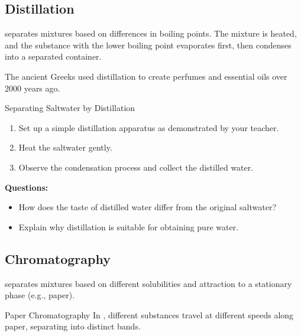 \subsection{Distillation}
 separates mixtures based on differences in boiling points. The mixture is heated, and the substance with the lower boiling point evaporates first, then condenses into a separated container.

\begin{marginfigure}
\centering
\caption{Simple distillation setup.}
\label{fig:distillation}
\end{marginfigure}

\begin{historylink}
The ancient Greeks used distillation to create perfumes and essential oils over 2000 years ago.
\end{historylink}

\begin{investigation}{Separating Saltwater by Distillation}
\begin{enumerate}
    \item Set up a simple distillation apparatus as demonstrated by your teacher.
    \item Heat the saltwater gently.
    \item Observe the condensation process and collect the distilled water.
\end{enumerate}

\textbf{Questions:}
\begin{itemize}
    \item How does the taste of distilled water differ from the original saltwater?
    \item Explain why distillation is suitable for obtaining pure water.
\end{itemize}
\end{investigation}

\subsection{Chromatography}
 separates mixtures based on different solubilities and attraction to a stationary phase (e.g., paper).

\begin{keyconcept}{Paper Chromatography}
In , different substances travel at different speeds along paper, separating into distinct bands.
\end{keyconcept}


